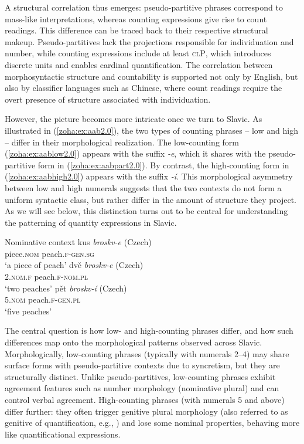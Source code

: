 \documentclass[output=paper,colorlinks,citecolor=brown
]{langscibook}
\begin{document}
\noindent A structural correlation thus emerges: pseudo-partitive phrases correspond to mass-like interpretations, whereas counting expressions give rise to count readings. This difference can be traced back to their respective structural makeup. Pseudo-partitives lack the projections responsible for individuation and number, while counting expressions include at least \textsc{clP}, which introduces discrete units and enables cardinal quantification. The correlation between morphosyntactic structure and countability is supported not only by English, but also by classifier languages such as Chinese, where count readings require the overt presence of structure associated with individuation.

However, the picture becomes more intricate once we turn to Slavic. As illustrated in (\ref{zoha:ex:aab2.0}), the two types of counting phrases -- low and high -- differ in their morphological realization. The low-counting form (\ref{zoha:ex:aablow2.0}) appears with the suffix \textit{-e}, which it shares with the pseudo-partitive form in (\ref{zoha:ex:aabpart2.0}). By contrast, the high-counting form in (\ref{zoha:ex:aabhigh2.0}) appears with the suffix \textit{-í}. This morphological asymmetry between low and high numerals suggests that the two contexts do not form a uniform syntactic class, but rather differ in the amount of structure they project. As we will see below, this distinction turns out to be central for understanding the patterning of quantity expressions in Slavic.

\ea Nominative context \label{zoha:ex:aab2.0}
    \ea \gll kus  \textit{broskv-e} (Czech)\\
    piece.\textsc{nom} peach.\textsc{f}-\textsc{gen.sg}\\
    \glt `a piece of peach' \label{zoha:ex:aabpart2.0}
    \ex \gll dvě  \textit{broskv-e} (Czech)\\
    2.\textsc{nom.f} peach.\textsc{f}-\textsc{nom.pl}\\
    \glt `two peaches' \label{zoha:ex:aablow2.0}
    \ex \gll pět  \textit{broskv-í} (Czech)\\
    5.\textsc{nom} peach.\textsc{f}-\textsc{gen.pl}\\
    \glt `five peaches' \label{zoha:ex:aabhigh2.0}
    \z
\z

\noindent The central question is how low- and high-counting phrases differ, and how such differences map onto the morphological patterns observed across Slavic. Morphologically, low-counting phrases (typically with numerals 2--4) may share surface forms with pseudo-partitive contexts due to syncretism, but they are structurally distinct. Unlike pseudo-partitives, low-counting phrases exhibit agreement features such as number morphology (nominative plural) and can control verbal agreement. High-counting phrases (with numerals 5 and above) differ further: they often trigger genitive plural morphology (also referred to as genitive of quantification, e.g., \citealt{franks2002}) and lose some nominal properties, behaving more like quantificational expressions.
\end{document}

